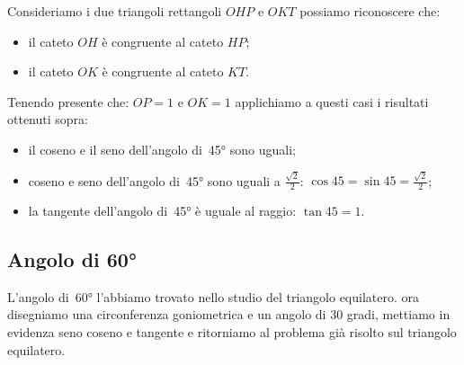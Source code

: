  \begin{minipage}{.45\textwidth}
  \begin{center}
\begin{inaccessibleblock}
    
\end{inaccessibleblock}
  \end{center}
 \end{minipage}
 \begin{minipage}{.45\textwidth}
Consideriamo i due triangoli rettangoli $OHP$ e $OKT$ possiamo riconoscere 
che:
\begin{itemize} [noitemsep]
 \item il cateto $OH$ è congruente al cateto $HP$; 
 \item il cateto $OK$ è congruente al cateto $KT$.\\
\end{itemize}
 \end{minipage}
 
Tenendo presente che: $OP=1$ e $OK=1$ applichiamo a questi casi i risultati 
ottenuti sopra:
\begin{itemize} [noitemsep]
 \item il coseno e il seno dell'angolo di~45° sono uguali;
 \item coseno e seno dell'angolo di~45° sono uguali a $\frac{\sqrt{2}}{2}$: 
  $\cos 45 = \sin 45 = \frac{\sqrt{2}}{2}$; 
 \item la tangente dell'angolo di~45° è uguale al raggio: 
  $\tan 45 = 1$.
\end{itemize}

\subsection{Angolo di 60°}

L'angolo di~60° l'abbiamo trovato nello studio del triangolo equilatero. ora 
disegniamo una circonferenza goniometrica e un angolo di 30 gradi, mettiamo 
in 
evidenza seno coseno e tangente e ritorniamo al problema già risolto sul 
triangolo equilatero.\\

